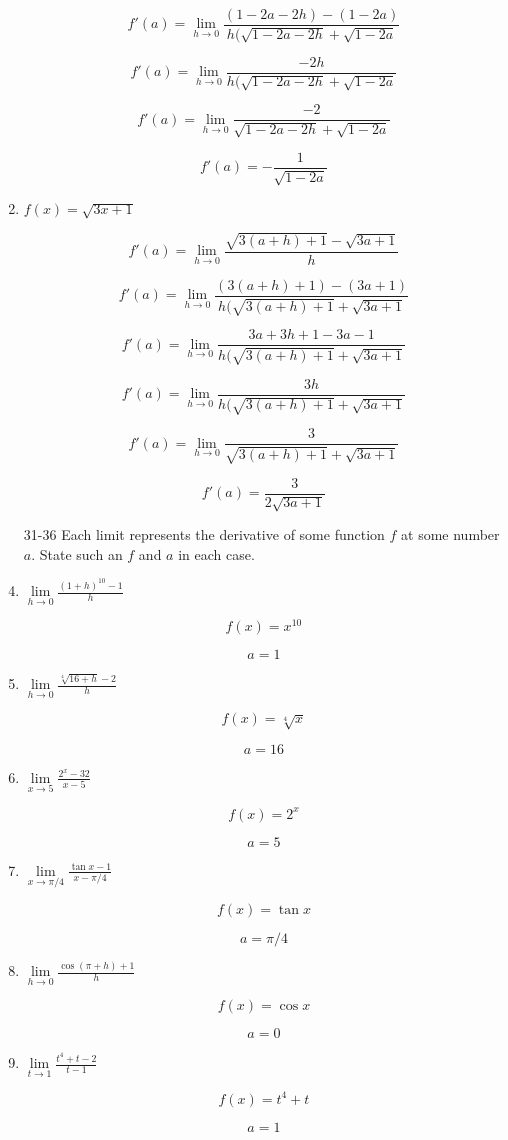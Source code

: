 \documentclass{article}
\begin{document}
\begin{enumerate}
			$$f'(a) = \lim \limits _{h \to 0} \frac{(1-2a-2h) - (1-2a)}{h(\sqrt{1-2a-2h} + \sqrt{1-2a}}$$

			$$f'(a) = \lim \limits _{h \to 0} \frac{-2h}{h(\sqrt{1-2a-2h} + \sqrt{1-2a}}$$

			$$f'(a) = \lim \limits _{h \to 0} \frac{-2}{\sqrt{1-2a-2h} + \sqrt{1-2a}}$$

			$$f'(a) = - \frac{1}{\sqrt{1-2a}}$$

		\item $f(x) = \sqrt{3x+1}$

			$$f'(a) = \lim \limits _{h \to 0} \frac{\sqrt{3(a+h)+1} - \sqrt{3a+1}}{h}$$

			$$f'(a) = \lim \limits _{h \to 0} \frac{(3(a+h)+1) - (3a+1)}{h(\sqrt{3(a+h)+1} + \sqrt{3a+1}}$$

			$$f'(a) = \lim \limits _{h \to 0} \frac{3a + 3h  + 1 - 3a - 1}{h(\sqrt{3(a+h)+1}+\sqrt{3a+1}}$$

			$$f'(a) = \lim \limits _{h \to 0} \frac{3h}{h(\sqrt{3(a+h)+1} + \sqrt{3a+1}}$$

			$$f'(a) = \lim \limits _{h \to 0} \frac{3}{\sqrt{3(a+h)+1} + \sqrt{3a+1}}$$

			$$f'(a) = \frac{3}{2\sqrt{3a+1}}$$

		\item[31-36] Each limit represents the derivative of some function $f$ at some number $a$. State
				such an $f$ and $a$ in each case.

		\item $\lim \limits _{h \to 0} \frac{(1+h)^{10} - 1}{h}$

			$$f(x) = x^{10}$$

			$$a = 1$$

		\item $\lim \limits _{h \to 0} \frac{\sqrt[4]{16+h} - 2}{h}$

			$$f(x) = \sqrt[4]{x}$$

			$$a = 16$$

		\item $\lim \limits _{x \to 5} \frac{2^x - 32}{x-5}$

			$$f(x) = 2^x$$

			$$a = 5$$

		\item $\lim \limits _{x \to \pi/4} \frac{\tan x - 1}{x - \pi/4}$

			$$f(x) = \tan x$$

			$$a = \pi/4$$

		\item $\lim \limits _{h \to 0} \frac{ \cos (\pi + h) + 1}{h}$

			$$f(x) = \cos x$$

			$$a = 0$$

		\item $\lim \limits _{t \to 1} \frac{t^4 + t - 2}{t-1}$

			$$f(x) = t^4 + t$$

			$$a = 1$$
	\end{enumerate}
\end{document}
